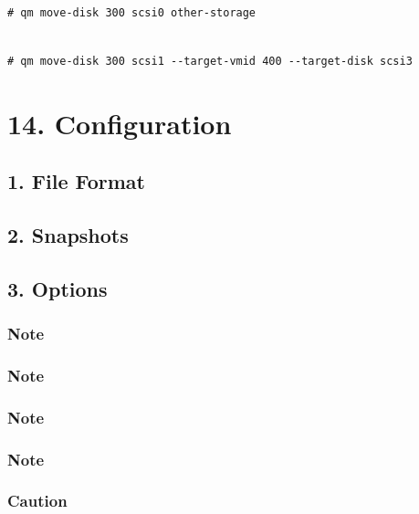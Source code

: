\begin{lstlisting}

# qm move-disk 300 scsi0 other-storage

\end{lstlisting}

\begin{lstlisting}

# qm move-disk 300 scsi1 --target-vmid 400 --target-disk scsi3

\end{lstlisting}


\section{14. Configuration}

\subsection{1. File Format}

\subsection{2. Snapshots}

\subsection{3. Options}

\subsubsection{Note}

\subsubsection{Note}

\subsubsection{Note}

\subsubsection{Note}

\subsubsection{Caution}

